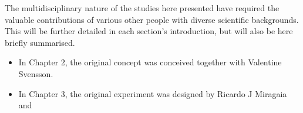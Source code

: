 
\begin{contributions}

The multidisciplinary nature of the studies here presented have required the valuable contributions of various other people with diverse scientific backgrounds. This will be further detailed in each section's introduction, but will also be here briefly summarised.

\begin{itemize}
\item In Chapter 2, the original concept was conceived together with Valentine Svensson.
\item In Chapter 3, the original experiment was designed by Ricardo J Miragaia and 
\end{itemize}


\end{contributions}